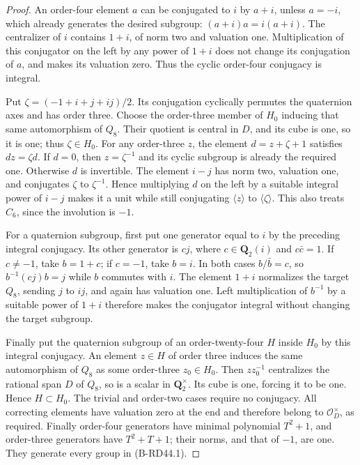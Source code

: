 \begin{proof}
An order-four element $a$ can be conjugated to $i$ by $a+i$,
unless $a=-i$, which already generates the desired subgroup:
$(a+i)a=i(a+i)$.
The centralizer of $i$ contains $1+i$, of norm two and valuation one.
Multiplication of this conjugator on the left by any power of $1+i$
does not change its conjugation of $a$, and makes its valuation zero.
Thus the cyclic order-four conjugacy is integral.

Put $\zeta=(-1+i+j+ij)/2$.
Its conjugation cyclically permutes the quaternion axes and has
order three. Choose the order-three member of $H_0$ inducing that
same automorphism of $Q_8$. Their quotient is central in $D$,
and its cube is one, so it is one; thus $\zeta\in H_0$.
For any order-three $z$, the element $d=z+\zeta+1$ satisfies
$dz=\zeta d$. If $d=0$, then $z=\zeta^{-1}$ and its cyclic
subgroup is already the required one. Otherwise $d$ is invertible.
The element $i-j$ has norm two, valuation one, and conjugates
$\zeta$ to $\zeta^{-1}$. Hence multiplying $d$ on the left by
a suitable integral power of $i-j$ makes it a unit while still
conjugating $\langle z\rangle$ to $\langle\zeta\rangle$.
This also treats $C_6$, since the involution is $-1$.

For a quaternion subgroup, first put one generator equal to $i$
by the preceding integral conjugacy. Its other generator is $cj$,
where $c\in\mathbf Q_2(i)$ and $c\bar c=1$.
If $c\ne-1$, take $b=1+c$; if $c=-1$, take $b=i$.
In both cases $b/\bar b=c$, so $b^{-1}(cj)b=j$ while $b$ commutes
with $i$. The element $1+i$ normalizes the target $Q_8$, sending
$j$ to $ij$, and again has valuation one. Left multiplication
of $b^{-1}$ by a suitable power of $1+i$ therefore makes the
conjugator integral without changing the target subgroup.

Finally put the quaternion subgroup of an order-twenty-four $H$
inside $H_0$ by this integral conjugacy. An element $z\in H$ of
order three induces the same automorphism of $Q_8$ as some
order-three $z_0\in H_0$. Then $zz_0^{-1}$ centralizes the
rational span $D$ of $Q_8$, so is a scalar in $\mathbf Q_2^\times$.
Its cube is one, forcing it to be one. Hence $H\subset H_0$.
The trivial and order-two cases require no conjugacy.
All correcting elements have valuation zero at the end and
therefore belong to $\mathcal O_D^\times$, as required.
Finally order-four generators have minimal polynomial $T^2+1$,
and order-three generators have $T^2+T+1$; their norms, and that
of $-1$, are one. They generate every group in (B-RD44.1).
\end{proof}

